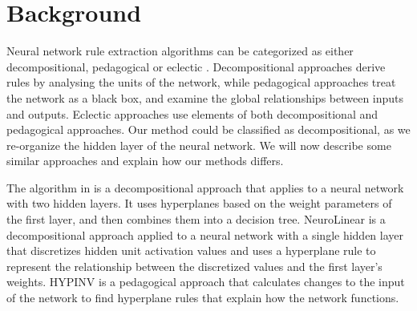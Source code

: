 








\section{Background}\label{ch5:bg}

Neural network rule extraction algorithms can be categorized as either decompositional, pedagogical or eclectic \cite{Andrews1995a}. Decompositional approaches derive rules by analysing the units of the network, while pedagogical approaches treat the network as a black box, and examine the global relationships between inputs and outputs. Eclectic approaches use elements of both decompositional and pedagogical approaches. Our method could be classified as decompositional, as we re-organize the hidden layer of the neural network. We will now describe some similar approaches and explain how our methods differs.

The algorithm in \cite{Kim2000} is a decompositional approach that applies to a neural network with two hidden layers. It uses hyperplanes based on the weight parameters of the first layer, and then combines them into a decision tree. NeuroLinear \cite{Setiono1997c} is a decompositional approach applied to a neural network with a single hidden layer that discretizes hidden unit activation values and uses a hyperplane rule to represent the relationship between the discretized values and the first layer's weights. HYPINV \cite{Saad2007b} is a pedagogical approach that calculates changes to the input of the network to find hyperplane rules that explain how the network functions. 

